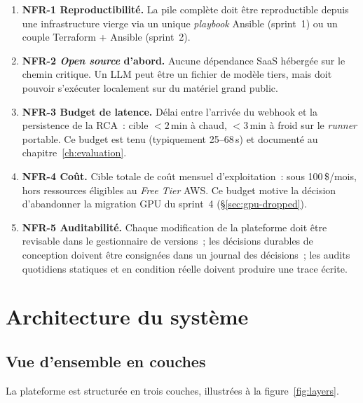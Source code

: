 \documentclass[11pt,a4paper,oneside]{report}
\begin{document}
\begin{enumerate}
  \item \textbf{NFR-1 Reproductibilité.} La pile complète doit être
        reproductible depuis une infrastructure vierge via un unique
        \emph{playbook} Ansible (sprint~1) ou un couple
        Terraform + Ansible (sprint~2).
  \item \textbf{NFR-2 \emph{Open source} d'abord.} Aucune
        dépendance SaaS hébergée sur le chemin critique. Un LLM
        peut être un fichier de modèle tiers, mais doit pouvoir
        s'exécuter localement sur du matériel grand public.
  \item \textbf{NFR-3 Budget de latence.} Délai entre l'arrivée du
        webhook et la persistence de la RCA~: cible
        $<2$\,min à chaud, $<3$\,min à froid sur le \emph{runner}
        portable. Ce budget est tenu (typiquement 25--68\,s) et
        documenté au chapitre~\ref{ch:evaluation}.
  \item \textbf{NFR-4 Coût.} Cible totale de coût mensuel
        d'exploitation~: sous 100\,\$/mois, hors ressources
        éligibles au \emph{Free Tier} AWS. Ce budget motive la
        décision d'abandonner la migration GPU du sprint~4
        (\S\ref{sec:gpu-dropped}).
  \item \textbf{NFR-5 Auditabilité.} Chaque modification de la
        plateforme doit être revisable dans le gestionnaire de
        versions~; les décisions durables de conception doivent
        être consignées dans un journal des décisions~; les audits
        quotidiens statiques et en condition réelle doivent
        produire une trace écrite.
\end{enumerate}

\chapter{Architecture du système}
\label{ch:architecture}

\section{Vue d'ensemble en couches}

La plateforme est structurée en trois couches, illustrées à la
figure~\ref{fig:layers}.
\end{document}
